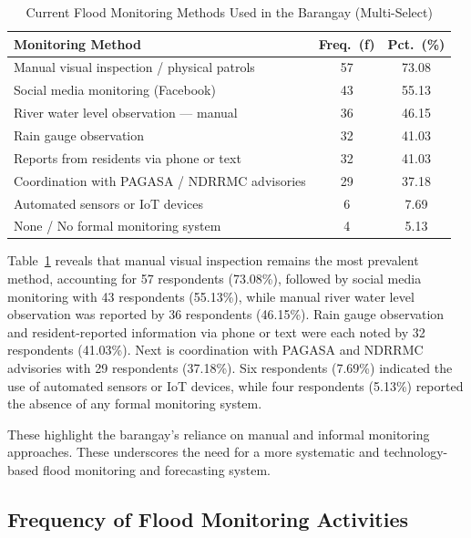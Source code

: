 \documentclass{research}
\begin{document}
\begin{table}[htbp]
\centering
\small
\caption{Current Flood Monitoring Methods Used in the Barangay (Multi-Select)}
\label{tab:methods}
\begin{tabular}{p{9.5cm}|c|c}
\hline
\textbf{Monitoring Method} & \textbf{Freq.\ (f)} & \textbf{Pct.\ (\%)} \\
\hline
Manual visual inspection / physical patrols     & 57 & 73.08 \\
Social media monitoring (Facebook)              & 43 & 55.13 \\
River water level observation --- manual        & 36 & 46.15 \\
Rain gauge observation                          & 32 & 41.03 \\
Reports from residents via phone or text        & 32 & 41.03 \\
Coordination with PAGASA / NDRRMC advisories    & 29 & 37.18 \\
Automated sensors or IoT devices                &  6 &  7.69 \\
None / No formal monitoring system              &  4 &  5.13 \\
\hline
\end{tabular}
\end{table}
 
Table~\ref{tab:methods} reveals that manual visual inspection remains the most prevalent
method, accounting for 57 respondents (73.08\%), followed by social media monitoring
with 43 respondents (55.13\%), while manual river water level observation was reported
by 36 respondents (46.15\%). Rain gauge observation and resident-reported information
via phone or text were each noted by 32 respondents (41.03\%). Next is coordination with
PAGASA and NDRRMC advisories with 29 respondents (37.18\%).
Six respondents (7.69\%) indicated the use of automated sensors or IoT devices,
while four respondents (5.13\%) reported the absence of any formal monitoring system.
 
These highlight the barangay's reliance on manual and informal
monitoring approaches. These underscores the need for a more systematic and technology-based flood monitoring and forecasting system.
 
\subsection{Frequency of Flood Monitoring Activities}
 
\end{document}
